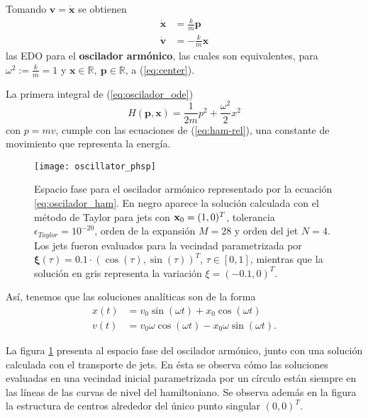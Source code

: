 Tomando $\mathbf{v} = \dot{\mathbf{x}}$ se obtienen
\begin{align}
 \dot{\mathbf{x}} &= \frac{k}{m} \mathbf{p} \nonumber \\
 \dot{\mathbf{v}} &= - \frac{k}{m} \mathbf{x}
 \label{eq:oscilador_ode}
\end{align}
las EDO para el \textbf{oscilador armónico}, las cuales son equivalentes, para $\omega^2 := \frac{k}{m} = 1$ y $\mathbf{x} \in \mathbb{R},\ \mathbf{p} \in \mathbb{R}$, a (\ref{eq:center}). 

La primera integral de (\ref{eq:oscilador_ode})
\begin{equation}
 H(\mathbf{p},\mathbf{x}) = \frac{1}{2m}p^2 + \frac{\omega^2}{2} x^2
 \label{eq:oscilador_ham}
\end{equation}
con $p=mv$, cumple con las ecuaciones de (\ref{eq:ham-rel}), una constante de movimiento que representa la energía.

\begin{figure}[h!]
 \centering
 \texttt{[image: oscillator\_phsp]}
 \caption{Espacio fase para el oscilador armónico representado por la ecuación \ref{eq:oscilador_ham}. En negro aparece la solución calculada con el método de Taylor para jets con $\mathbf{x}_0 = (1,0)^T$, tolerancia $\epsilon_{Taylor} = 10^{-20}$, orden de la expansión $M = 28$ y orden del jet $N=4$. Los jets fueron evaluados para la vecindad parametrizada por $\mathbf{\xi}(\tau) = 0.1\cdot \left( \cos(\tau), \sin(\tau) \right)^T$, $\tau \in [0,1]$, mientras que la solución en gris representa la variación $\xi = (-0.1,0)^T$.}
 \label{fig:oscilador_phsp}
\end{figure}

Así, tenemos que las soluciones analíticas son de la forma 
\begin{align}
 x(t) &= v_{0}\sin{(\omega t)} + x_{0}\cos{(\omega t)} \nonumber \\ 
 v(t) &= v_{0}\omega\cos{(\omega t)} - x_{0}\omega\sin{(\omega t)}. 
 \label{eq:oscilador_analytical}
\end{align}

La figura \ref{fig:oscilador_phsp} presenta al espacio fase del oscilador armónico, junto con una solución calculada con el transporte de jets. En ésta se observa cómo las soluciones evaluadas en una vecindad inicial parametrizada por un círculo están siempre en las líneas de las curvas de nivel del hamiltoniano. Se observa además en la figura la estructura de centros alrededor del único punto singular $(0,0)^T$.

